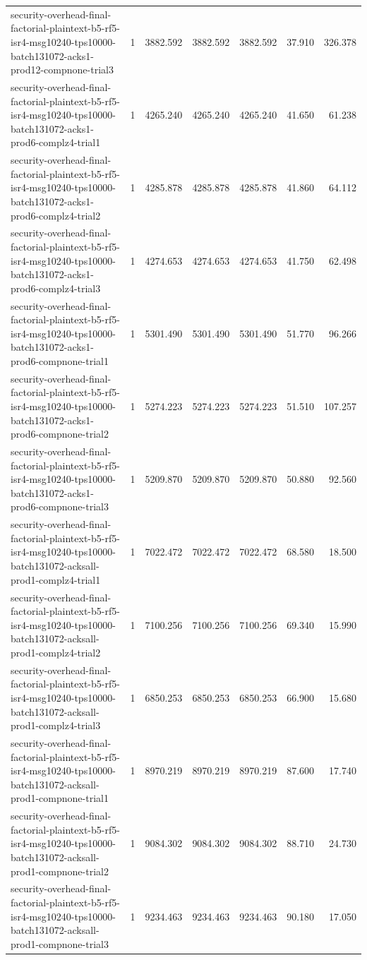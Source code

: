 \begin{tabular}{lrrrrrr}
security-overhead-final-factorial-plaintext-b5-rf5-isr4-msg10240-tps10000-batch131072-acks1-prod12-compnone-trial3 & 1 & 3882.592 & 3882.592 & 3882.592 & 37.910 & 326.378 \\
security-overhead-final-factorial-plaintext-b5-rf5-isr4-msg10240-tps10000-batch131072-acks1-prod6-complz4-trial1 & 1 & 4265.240 & 4265.240 & 4265.240 & 41.650 & 61.238 \\
security-overhead-final-factorial-plaintext-b5-rf5-isr4-msg10240-tps10000-batch131072-acks1-prod6-complz4-trial2 & 1 & 4285.878 & 4285.878 & 4285.878 & 41.860 & 64.112 \\
security-overhead-final-factorial-plaintext-b5-rf5-isr4-msg10240-tps10000-batch131072-acks1-prod6-complz4-trial3 & 1 & 4274.653 & 4274.653 & 4274.653 & 41.750 & 62.498 \\
security-overhead-final-factorial-plaintext-b5-rf5-isr4-msg10240-tps10000-batch131072-acks1-prod6-compnone-trial1 & 1 & 5301.490 & 5301.490 & 5301.490 & 51.770 & 96.266 \\
security-overhead-final-factorial-plaintext-b5-rf5-isr4-msg10240-tps10000-batch131072-acks1-prod6-compnone-trial2 & 1 & 5274.223 & 5274.223 & 5274.223 & 51.510 & 107.257 \\
security-overhead-final-factorial-plaintext-b5-rf5-isr4-msg10240-tps10000-batch131072-acks1-prod6-compnone-trial3 & 1 & 5209.870 & 5209.870 & 5209.870 & 50.880 & 92.560 \\
security-overhead-final-factorial-plaintext-b5-rf5-isr4-msg10240-tps10000-batch131072-acksall-prod1-complz4-trial1 & 1 & 7022.472 & 7022.472 & 7022.472 & 68.580 & 18.500 \\
security-overhead-final-factorial-plaintext-b5-rf5-isr4-msg10240-tps10000-batch131072-acksall-prod1-complz4-trial2 & 1 & 7100.256 & 7100.256 & 7100.256 & 69.340 & 15.990 \\
security-overhead-final-factorial-plaintext-b5-rf5-isr4-msg10240-tps10000-batch131072-acksall-prod1-complz4-trial3 & 1 & 6850.253 & 6850.253 & 6850.253 & 66.900 & 15.680 \\
security-overhead-final-factorial-plaintext-b5-rf5-isr4-msg10240-tps10000-batch131072-acksall-prod1-compnone-trial1 & 1 & 8970.219 & 8970.219 & 8970.219 & 87.600 & 17.740 \\
security-overhead-final-factorial-plaintext-b5-rf5-isr4-msg10240-tps10000-batch131072-acksall-prod1-compnone-trial2 & 1 & 9084.302 & 9084.302 & 9084.302 & 88.710 & 24.730 \\
security-overhead-final-factorial-plaintext-b5-rf5-isr4-msg10240-tps10000-batch131072-acksall-prod1-compnone-trial3 & 1 & 9234.463 & 9234.463 & 9234.463 & 90.180 & 17.050 \\

\end{tabular}
